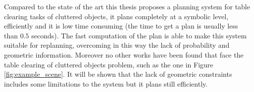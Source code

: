 
\mbox{} 

Compared to the state of the art this thesis proposes a planning system for table clearing tasks of cluttered objects, it plans completely at a symbolic level, efficiently and it is low time consuming  (the time to get a plan is usually less than $0.5$ seconds). The fast computation of the plan is able to make this system suitable for replanning, overcoming in this way the lack of probability and geometric information.  Moreover no other works have been found that face the table clearing of cluttered objects problem, such as the one in Figure \ref{fig:example_scene}. It will be shown that the lack of geometric constraints includes some limitations to the system but it plans still efficiently.  






